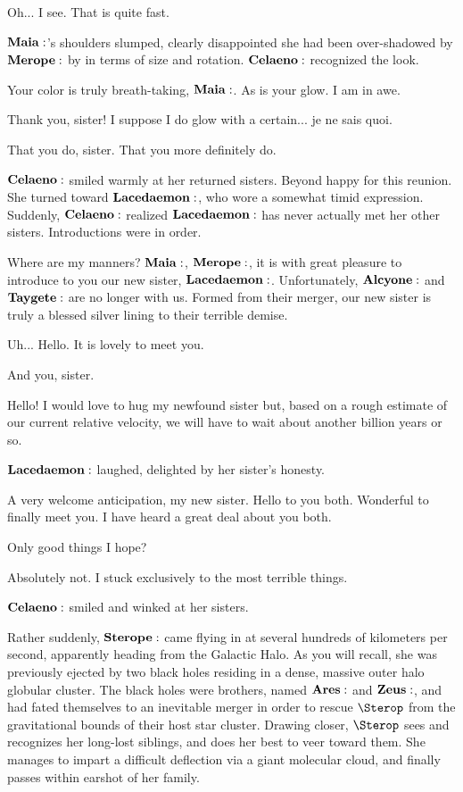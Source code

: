 \documentclass[main.tex]{subfiles}
\begin{document}
\Celaeno Oh... I see.  That is quite fast.

$\Maia$'s shoulders slumped, clearly disappointed she had been over-shadowed by $\Merope$ by in terms of size and rotation.  $\Celaeno$ recognized the look.

\Celaeno Your color is truly breath-taking, $\Maia$.  As is your glow.  I am in awe.

\Maia Thank you, sister!  I suppose I do glow with a certain... je ne sais quoi.

\Celaeno That you do, sister.  That you more definitely do.

$\Celaeno$ smiled warmly at her returned sisters.  Beyond happy for this reunion.  She turned toward $\Lacedaemon$, who wore a somewhat timid expression.  Suddenly, $\Celaeno$ realized $\Lacedaemon$ has never actually met her other sisters.  Introductions were in order.

\Celaeno  Where are my manners?  $\Maia$, $\Merope$, it is with great pleasure to introduce to you our new sister, $\Lacedaemon$.  Unfortunately, $\Alcyone$ and $\Taygete$ are no longer with us.  Formed from their merger, our new sister is truly a blessed silver lining to their terrible demise.

\Lacedaemon Uh... Hello.  It is lovely to meet you.

\Merope And you, sister.

\Maia Hello!  I would love to hug my newfound sister but, based on a rough estimate of our current relative velocity, we will have to wait about another billion years or so.

$\Lacedaemon$ laughed, delighted by her sister's honesty.

\Lacedaemon A very welcome anticipation, my new sister.  Hello to you both.  Wonderful to finally meet you.  I have heard a great deal about you both.

\Merope Only good things I hope?

\Celaeno Absolutely not.  I stuck exclusively to the most terrible things.

$\Celaeno$ smiled and winked at her sisters.

Rather suddenly, $\Sterope$ came flying in at several hundreds of kilometers per second, apparently heading from the Galactic Halo.  As you will recall, she was previously ejected by two black holes residing in a dense, massive outer halo globular cluster.  The black holes were brothers, named $\Ares$ and $\Zeus$, and had fated themselves to an inevitable merger in order to rescue $\Sterop$ from the gravitational bounds of their host star cluster.  Drawing closer, $\Sterop$ sees and recognizes her long-lost siblings, and does her best to veer toward them.  She manages to impart a difficult deflection via a giant molecular cloud, and finally passes within earshot of her family.  
\end{document}
